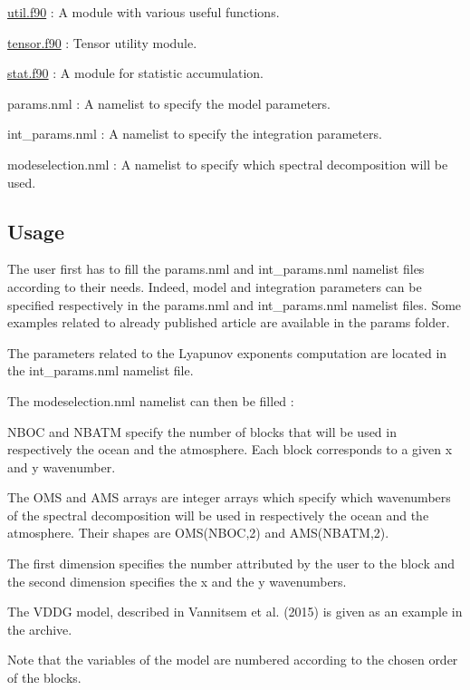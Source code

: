 \begin{DoxyItemize}
\item \hyperlink{util_8f90}{util.\+f90} \+: A module with various useful functions.
\item \hyperlink{tensor_8f90}{tensor.\+f90} \+: Tensor utility module.
\item \hyperlink{stat_8f90}{stat.\+f90} \+: A module for statistic accumulation.
\item params.\+nml \+: A namelist to specify the model parameters.
\item int\+\_\+params.\+nml \+: A namelist to specify the integration parameters.
\item modeselection.\+nml \+: A namelist to specify which spectral decomposition will be used.
\end{DoxyItemize}





\subsection*{Usage}

The user first has to fill the params.\+nml and int\+\_\+params.\+nml namelist files according to their needs. Indeed, model and integration parameters can be specified respectively in the params.\+nml and int\+\_\+params.\+nml namelist files. Some examples related to already published article are available in the params folder.

The parameters related to the Lyapunov exponents computation are located in the int\+\_\+params.\+nml namelist file.

The modeselection.\+nml namelist can then be filled \+:
\begin{DoxyItemize}
\item N\+B\+OC and N\+B\+A\+TM specify the number of blocks that will be used in respectively the ocean and the atmosphere. Each block corresponds to a given x and y wavenumber.
\item The O\+MS and A\+MS arrays are integer arrays which specify which wavenumbers of the spectral decomposition will be used in respectively the ocean and the atmosphere. Their shapes are O\+M\+S(\+N\+B\+O\+C,2) and A\+M\+S(\+N\+B\+A\+T\+M,2).
\item The first dimension specifies the number attributed by the user to the block and the second dimension specifies the x and the y wavenumbers.
\item The V\+D\+DG model, described in Vannitsem et al. (2015) is given as an example in the archive.
\item Note that the variables of the model are numbered according to the chosen order of the blocks.
\end{DoxyItemize}

